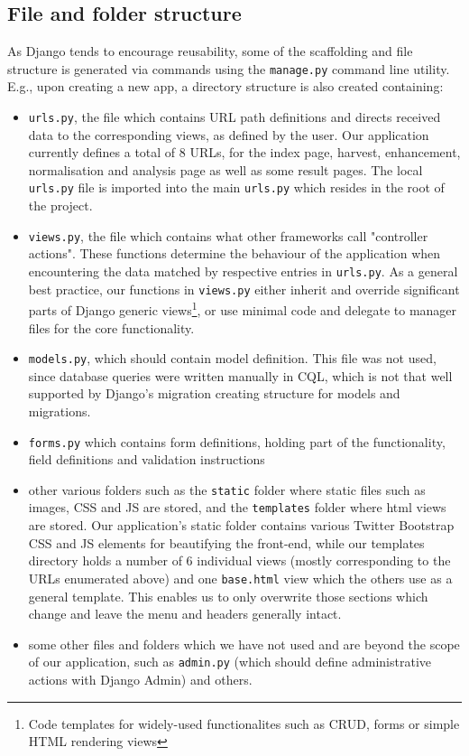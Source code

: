 \subsection{File and folder structure}
As Django tends to encourage reusability, some of the scaffolding and file structure is generated via commands using the \texttt{manage.py} command line utility. E.g., upon creating a new app, a directory structure is also created containing:

\begin{itemize}
\item \texttt{urls.py}, the file which contains URL path definitions and directs received data to the corresponding views, as defined by the user. Our application currently defines a total of 8 URLs, for the index page, harvest, enhancement, normalisation and analysis page as well as some result pages. The local \texttt{urls.py} file is imported into the main \texttt{urls.py} which resides in the root of the project.
\item \texttt{views.py}, the file which contains what other frameworks call "controller actions". These functions determine the behaviour of the application when encountering the data matched by respective entries in \texttt{urls.py}. As a general best practice, our functions in \texttt{views.py} either inherit and override significant parts of Django generic views\footnote{Code templates for widely-used functionalites such as CRUD, forms or simple HTML rendering views}, or use minimal code and delegate to manager files for the core functionality.
\item \texttt{models.py}, which should contain model definition. This file was not used, since database queries were written manually in CQL, which is not that well supported by Django's migration creating structure for models and migrations.
\item \texttt{forms.py} which contains form definitions, holding part of the functionality, field definitions and validation instructions
\item other various folders such as the \texttt{static} folder where static files such as images, CSS and JS are stored, and the \texttt{templates} folder where html views are stored. Our application's static folder contains various Twitter Bootstrap CSS and JS elements for beautifying the front-end, while our templates directory holds a number of 6 individual views (mostly corresponding to the URLs enumerated above) and one \texttt{base.html} view which the others use as a general template. This enables us to only overwrite those sections which change and leave the menu and headers generally intact.
\item some other files and folders which we have not used and are beyond the scope of our application, such as \texttt{admin.py} (which should define administrative actions with Django Admin) and others.
\end{itemize}

